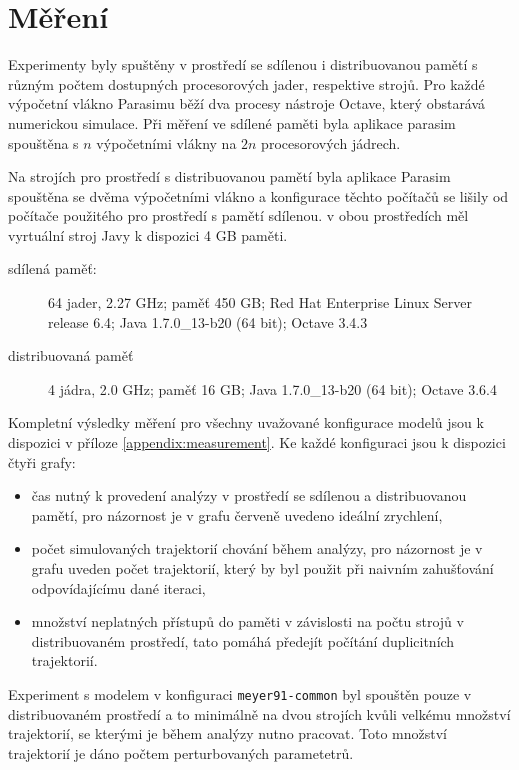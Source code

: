 \section{Měření}\label{section:measurement}

Experimenty byly spuštěny v prostředí se sdílenou i distribuovanou pamětí s různým
počtem dostupných procesorových jader, respektive strojů. Pro každé výpočetní vlákno
Parasimu běží dva procesy nástroje Octave, který obstarává numerickou simulace. Při měření
ve sdílené paměti byla aplikace parasim spouštěna s $n$ výpočetními vlákny na $2n$
procesorových jádrech.

Na strojích pro prostředí s distribuovanou pamětí byla aplikace Parasim spouštěna se dvěma
výpočetními vlákno a konfigurace těchto počítačů se lišily od počítače použitého pro prostředí
s pamětí sdílenou. v obou prostředích měl vyrtuální stroj Javy k dispozici 4 GB paměti.

\begin{description}
	\item[sdílená paměť: ]
		 64 jader, 2.27 GHz; paměť 450 GB; Red Hat Enterprise Linux Server release 6.4; Java 1.7.0\_13-b20 (64 bit); Octave 3.4.3
	\item[distribuovaná paměť]
		4 jádra, 2.0 GHz; paměť 16 GB; Java 1.7.0\_13-b20 (64 bit); Octave 3.6.4
\end{description}

Kompletní výsledky měření pro všechny uvažované konfigurace modelů jsou k dispozici
v příloze \ref{appendix:measurement}. Ke každé konfiguraci jsou k dispozici čtyři grafy:

\begin{itemize}
	\item	čas nutný k provedení analýzy v prostředí se sdílenou a distribuovanou pamětí,
			pro názornost je v grafu červeně uvedeno ideální zrychlení,
	\item	počet simulovaných trajektorií chování během analýzy, pro názornost je v grafu
			uveden počet trajektorií, který by byl použit při naivním zahušťování odpovídajícímu
			dané iteraci,
	\item	množství neplatných přístupů do paměti v závislosti na počtu strojů v distribuovaném prostředí,
			tato pomáhá předejít po\-čí\-tá\-ní duplicitních trajektorií.
\end{itemize}

Experiment s modelem v konfiguraci \texttt{meyer91-common} byl spouštěn pouze v distribuovaném prostředí
a to minimálně na dvou strojích kvůli velkému množství trajektorií, se kterými je během analýzy nutno
pracovat. Toto množství trajektorií je dáno počtem perturbovaných parametetrů.

